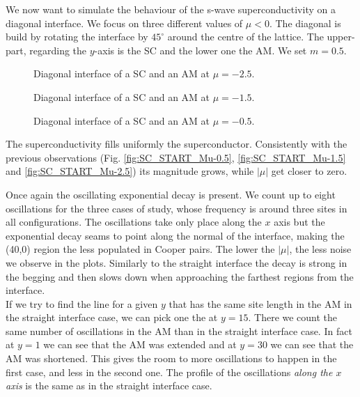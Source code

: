 \documentclass[..\main.tex]{subfile}
\begin{document}
We now want to simulate the behaviour of the s-wave superconductivity on a diagonal interface. We focus on three different values of $\mu<0$.  
The diagonal is build by rotating the interface by $45^{\circ}$ around the centre of the lattice. The upper-part, regarding the $y$-axis is the SC
and the lower one the AM. We set $m=0.5$.
\begin{figure}[H]
    \centering
    
    \caption{Diagonal interface of a SC and an AM at $\mu = -2.5$.}
\end{figure}
\begin{figure}[H]
    \centering
    
    \caption{Diagonal interface of a SC and an AM at $\mu = -1.5$.}
\end{figure}
\begin{figure}[H]
    \centering
    
    \caption{Diagonal interface of a SC and an AM at $\mu = -0.5$.}
\end{figure}
The superconductivity fills uniformly the superconductor. Consistently with the previous observations 
(Fig. \ref{fig:SC_START_Mu-0.5}, \ref{fig:SC_START_Mu-1.5} and \ref{fig:SC_START_Mu-2.5}) its magnitude grows, while $|\mu|$ get closer to zero.
 

Once again the oscillating exponential decay is present. We count up to eight oscillations for the three cases of study, whose
frequency is around three sites in all configurations. The oscillations take only place along the $x$ axis but the exponential decay
seams to point along the normal of the interface, making the (40,0) region the less populated in Cooper pairs.
The lower the $|\mu|$, the less noise we observe in the plots. Similarly to the straight interface the decay is strong in the begging
and then slows down when approaching the farthest regions from the interface.\\

If we try to find the line for a given $y$ that has the same site length in the AM in the straight interface case, we can pick one the at $y=15$.
There we count the same number of oscillations in the AM than in the straight interface case. In fact at $y=1$ we can see that the AM was
extended and at $y=30$ we can see that the AM was shortened. This gives the room to more oscillations to happen in the first case,
and less in the second one. The profile of the oscillations \textit{along the $x$ axis} is the same as in the straight interface case. \\
\end{document}
